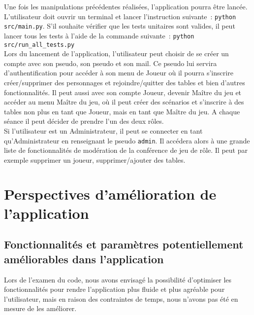 \documentclass[11pt]{article}
\begin{document}
Une fois les manipulations précédentes réalisées, l'application pourra être lancée. L'utilisateur doit ouvrir un terminal et lancer l’instruction suivante~: \texttt{python src/main.py}. S’il souhaite vérifier que les tests unitaires sont valides, il peut lancer tous les tests à l'aide de la commande suivante~:
\texttt{python src/run\_all\_tests.py} \\

Lors du lancement de l'application, l'utilisateur peut choisir de se créer un compte avec son pseudo, son pseudo et son mail. Ce pseudo lui servira d’authentification pour accéder à son menu de Joueur où il pourra s’inscrire créer/supprimer des personnages et rejoindre/quitter des tables et bien d’autres fonctionnalités. Il peut aussi avec son compte Joueur, devenir Maître du jeu et accéder au menu Maître du jeu, où il peut créer des scénarios et s’inscrire à des tables non plus en tant que Joueur, mais en tant que Maître du jeu. A chaque séance il peut décider de prendre l’un des deux rôles.\\

Si l'utilisateur est un Administrateur, il peut se connecter en tant qu’Administrateur en renseignant le pseudo \texttt{admin}. Il accédera alors à une grande liste de fonctionnalités de modération de la conférence de jeu de rôle. Il peut par exemple supprimer un joueur, supprimer/ajouter des tables.






\newpage
\section{Perspectives d'amélioration de l'application}

\subsection{Fonctionnalités et paramètres potentiellement améliorables dans l'application}

Lors de l'examen du code, nous avons envisagé la possibilité d'optimiser les fonctionnalités pour rendre l'application plus fluide et plus agréable pour l'utilisateur, mais en raison des contraintes de temps, nous n'avons pas été en mesure de les améliorer.\\
\end{document}
